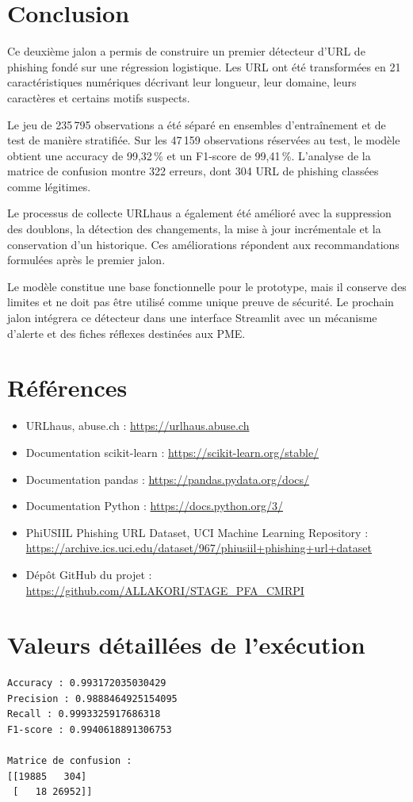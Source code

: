 \documentclass[11pt,a4paper]{report}
\begin{document}
\chapter{Conclusion}

Ce deuxième jalon a permis de construire un premier détecteur d'URL de
phishing fondé sur une régression logistique. Les URL ont été transformées en
21 caractéristiques numériques décrivant leur longueur, leur domaine, leurs
caractères et certains motifs suspects.

Le jeu de 235\,795 observations a été séparé en ensembles d'entraînement et
de test de manière stratifiée. Sur les 47\,159 observations réservées au test,
le modèle obtient une accuracy de 99,32\,\% et un F1-score de 99,41\,\%.
L'analyse de la matrice de confusion montre 322 erreurs, dont 304 URL de
phishing classées comme légitimes.

Le processus de collecte URLhaus a également été amélioré avec la suppression
des doublons, la détection des changements, la mise à jour incrémentale et la
conservation d'un historique. Ces améliorations répondent aux recommandations
formulées après le premier jalon.

Le modèle constitue une base fonctionnelle pour le prototype, mais il conserve
des limites et ne doit pas être utilisé comme unique preuve de sécurité. Le
prochain jalon intégrera ce détecteur dans une interface Streamlit avec un
mécanisme d'alerte et des fiches réflexes destinées aux PME.

\chapter*{Références}

\begin{itemize}
  \item URLhaus, abuse.ch : \url{https://urlhaus.abuse.ch}
  \item Documentation scikit-learn :
        \url{https://scikit-learn.org/stable/}
  \item Documentation pandas : \url{https://pandas.pydata.org/docs/}
  \item Documentation Python : \url{https://docs.python.org/3/}
  \item PhiUSIIL Phishing URL Dataset, UCI Machine Learning Repository :
        \url{https://archive.ics.uci.edu/dataset/967/phiusiil+phishing+url+dataset}
  \item Dépôt GitHub du projet :
        \url{https://github.com/ALLAKORI/STAGE_PFA_CMRPI}
\end{itemize}

\appendix
\chapter{Valeurs détaillées de l'exécution}

\begin{verbatim}
Accuracy : 0.993172035030429
Precision : 0.9888464925154095
Recall : 0.9993325917686318
F1-score : 0.9940618891306753

Matrice de confusion :
[[19885   304]
 [   18 26952]]
\end{verbatim}
\end{document}
